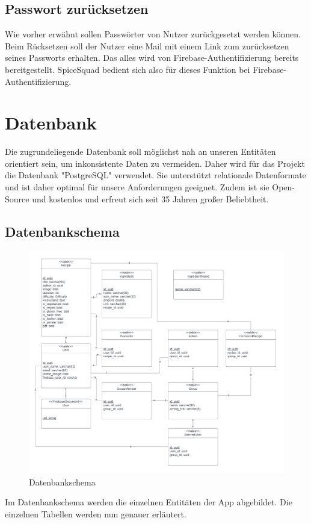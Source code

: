 \documentclass[parskip=full]{scrartcl}
\begin{document}
\subsection{Passwort zurücksetzen}
Wie vorher erwähnt sollen Passwörter von Nutzer zurückgesetzt werden können. Beim Rücksetzen soll der Nutzer eine Mail mit einem Link zum zurücksetzen seines Passworts erhalten.
Das alles wird von Firebase-Authentifizierung bereits bereitgestellt. SpiceSquad bedient sich also für dieses Funktion bei Firebase-Authentifizierung.
\newpage

\section{Datenbank}
Die zugrundeliegende Datenbank soll möglichst nah an unseren Entitäten orientiert sein, um inkonsistente Daten zu vermeiden. Daher wird für das Projekt die Datenbank "PostgreSQL" verwendet. Sie unterstützt relationale Datenformate und ist daher optimal für unsere Anforderungen geeignet. Zudem ist sie Open-Source und kostenlos und erfreut sich seit 35 Jahren großer Beliebtheit.
\subsection{Datenbankschema}
\begin{figure}[htp]
    \centering
    \includegraphics[width = \linewidth]{images/database/databaseSchema.pdf}
    \caption{Datenbankschema}
\end{figure}
Im Datenbankschema werden die einzelnen Entitäten der App abgebildet. Die einzelnen Tabellen werden nun genauer erläutert.
\newpage
\end{document}

